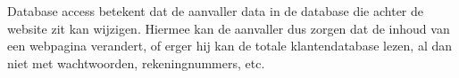 Database access betekent dat de aanvaller data in de database die achter de website zit kan wijzigen. Hiermee kan de aanvaller dus zorgen dat de inhoud van een webpagina verandert, of erger hij kan de totale klantendatabase lezen, al dan niet met wachtwoorden, rekeningnummers, etc.
